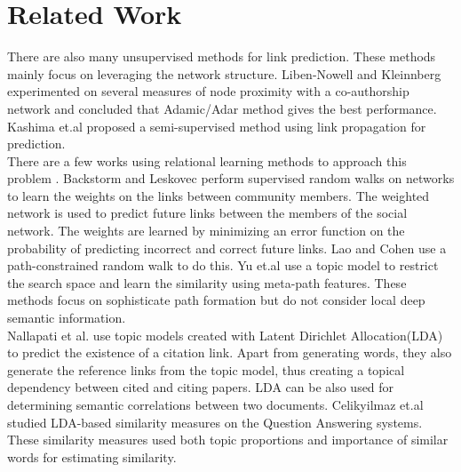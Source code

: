 \documentclass{article} %
\begin{document}
\section{Related Work}
There are also many unsupervised methods for link prediction.  These methods mainly focus on leveraging the network structure. Liben-Nowell and Kleinnberg \cite{Liben-Nowell2007} experimented on several measures of node proximity with a co-authorship network and concluded that Adamic/Adar method gives the best performance. Kashima et.al \cite{Kashima2009} proposed a semi-supervised method using link propagation for prediction.\\
There are a few works using relational learning methods to approach this problem \cite{Taskar2003,Popescul2003}. Backstorm and Leskovec \cite{Backstrom:2011:SRW:1935826.1935914} perform supervised random walks on networks to learn the weights on the links between community members. The weighted network is used to predict future links between the members of the social network. The weights are learned by minimizing an error function on the probability of predicting incorrect and correct future links. Lao and Cohen \cite{Lao2010} use a path-constrained random walk to do this. Yu et.al \cite{Yu2012} use a topic model to restrict the search space and learn the similarity using meta-path features. These methods focus on sophisticate path formation but do not consider local deep semantic information. \\
Nallapati et al. \cite{nallapati2008joint} use topic models created with Latent Dirichlet Allocation(LDA) \cite{blei2003latent} to predict the existence of a citation link. Apart from generating words, they also generate the reference links from the topic model, thus creating a topical dependency between cited and citing papers. LDA can be also used for determining semantic correlations between two documents. Celikyilmaz et.al \cite{Celikyilmaz:2010:LBS:1867767.1867768} studied LDA-based similarity measures on the Question Answering systems. These similarity measures used both topic proportions and importance of similar words for estimating similarity.\\
\end{document}
